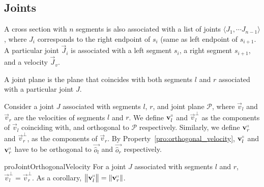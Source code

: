 \subsection{Joints}
\label{sec:joints}

\begin{definition}
\label{def:joints}
A cross section with $n$ segments is also associated with a list of joints $ \langle J_1,\cdots J_{n-1} \rangle$,
where $J_i$ corresponds to the right endpoint of $s_i$ (same as left endpoint of $s_{i+1}$.
A particular joint $\vec J_i$ is associated with a left segment $s_i$, a right segment $s_{i+1}$, and a velocity $\vec J_v$.
\end{definition}

\begin{definition}
\label{def:joint_plane}
A joint plane is the plane that coincides with both segments $l$ and $r$ associated with a particular joint $J$.
\end{definition}

\begin{definition}
\label{def:joint_plane_velocity}
Consider a joint $J$ associated with segments $l$, $r$, and joint plane $\mathcal P$,
where $\vec v_l$ and $\vec v_r$ are the velocities of segments $l$ and $r$.
We define $\vec v_l^\shortparallel$ and $\vec v_l^\perp$ as the components of $\vec v_l$ coinciding with,
and orthogonal to $\mathcal P$ respectively.
Similarly, we define $\vec v_r^\shortparallel$ and $\vec v_r^\perp$, as the components of $\vec v_r$.
By Property~\ref{pro:orthogonal_velocity}, $\vec v_l^\shortparallel$ and $\vec v_r^\shortparallel$
have to be orthogonal to $\vec{\hat o_l}$ and $\vec{\hat o_r}$ respectively.
\end{definition}

\begin{restatable}{pro}{JointOrthogonalVelocity}
\label{pro:joint_orthogonal_velocity}
For a joint $J$ associated with segments $l$ and $r$, $\vec v_l^\perp = \vec v_r^\perp$.
As a corollary, $ \left\| \vec v_l^\shortparallel\right\| = \left\| \vec v_r^\shortparallel\right\|$.
\end{restatable}
